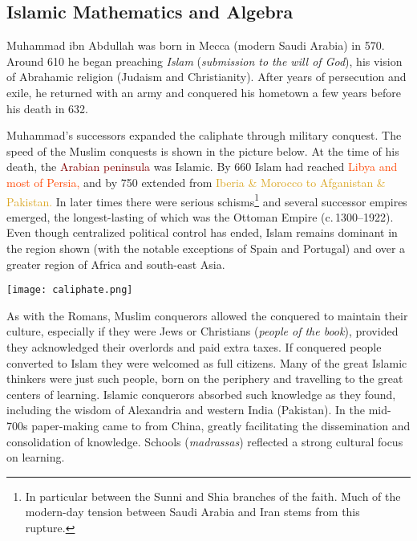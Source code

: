 \clearpage

\subsection{Islamic Mathematics and Algebra}\label{sec:islamalgebra}

Muhammad ibn Abdullah was born in Mecca (modern Saudi Arabia) in 570. Around 610 he began preaching \emph{Islam} (\emph{submission to the will of God}), his vision of Abrahamic religion (Judaism and Christianity). After years of persecution and exile, he returned with an army and conquered his hometown a few years before his death in 632.\smallbreak

Muhammad's successors expanded the caliphate through military conquest. The speed of the Muslim conquests is shown in the picture below. At the time of his death, the \textcolor{Maroon}{Arabian peninsula} was Islamic. By 660 Islam had reached \textcolor{OrangeRed}{Libya and most of Persia,} and by 750 extended from \textcolor{Goldenrod}{Iberia \& Morocco to Afganistan \& Pakistan.} In later times there were serious schisms\footnote{In particular between the Sunni and Shia branches of the faith. Much of the modern-day tension between Saudi Arabia and Iran stems from this rupture.} and several successor empires emerged, the longest-lasting of which was the Ottoman Empire (c.\,1300--1922). Even though centralized political control has ended, Islam remains dominant in the region shown (with the notable exceptions of Spain and Portugal) and over a greater region of Africa and south-east Asia.
\begin{center}
\texttt{[image: caliphate.png]}
\end{center}
As with the Romans, Muslim conquerors allowed the conquered to maintain their culture, especially if they were Jews or Christians (\emph{people of the book}), provided they acknowledged their overlords and paid extra taxes. If conquered people converted to Islam they were welcomed as full citizens. Many of the great Islamic thinkers were just such people, born on the periphery and travelling to the great centers of learning. Islamic conquerors absorbed such knowledge as they found, including the wisdom of Alexandria and western India (Pakistan). In the mid-700s paper-making came to from China, greatly facilitating the dissemination and consolidation of knowledge. Schools (\emph{madrassas}) reflected a strong cultural focus on learning.\smallbreak

